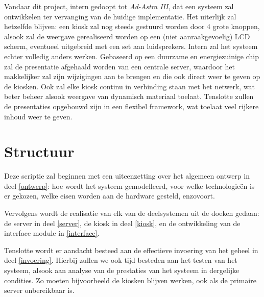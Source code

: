 Vandaar dit project, intern gedoopt tot \emph{Ad-Astra III}, dat een systeem zal ontwikkelen ter vervanging van de huidige implementatie. Het uiterlijk zal hetzelfde blijven: een kiosk zal nog steeds gestuurd worden door 4 grote knoppen, alsook zal de weergave gerealiseerd worden op een (niet aanraakgevoelig) LCD scherm, eventueel uitgebreid met een set aan luidsprekers.
Intern zal het systeem echter volledig anders werken. Gebaseerd op een duurzame en energiezuinige chip zal de presentatie afgehaald worden van een centrale server, waardoor het makkelijker zal zijn wijzigingen aan te brengen en die ook direct weer te geven op de kiosken. Ook zal elke kiosk continu in verbinding staan met het netwerk, wat beter beheer alsook weergave van dynamisch materiaal toelaat. Tenslotte zullen de presentaties opgebouwd zijn in een flexibel framework, wat toelaat veel rijkere inhoud weer te geven.


%
%

\chapter{Structuur}
\label{chat:structuur}

Deze scriptie zal beginnen met een uiteenzetting over het algemeen ontwerp in deel \ref{ontwerp}: hoe wordt het systeem gemodelleerd, voor welke technologieën is er gekozen, welke eisen worden aan de hardware gesteld, enzovoort.

Vervolgens wordt de realisatie van elk van de deelsystemen uit de doeken gedaan: de server in deel \ref{server}, de kiosk in deel \ref{kiosk}, en de ontwikkeling van de interface module in \ref{interface}.

Tenslotte wordt er aandacht besteed aan de effectieve invoering van het geheel in deel \ref{invoering}. Hierbij zullen we ook tijd besteden aan het testen van het systeem, alsook aan analyse van de prestaties van het systeem in dergelijke condities. Zo moeten bijvoorbeeld de kiosken blijven werken, ook als de primaire server onbereikbaar is.
